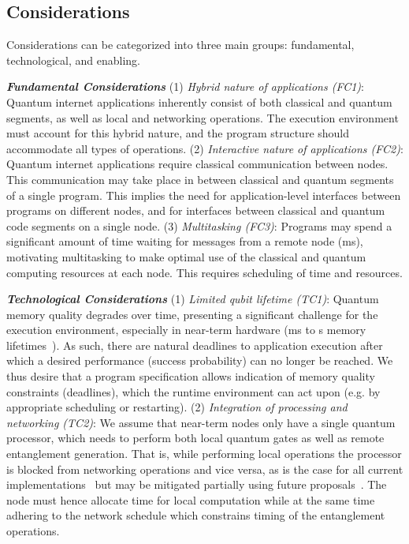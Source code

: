 \subsection{Considerations}
Considerations can be categorized into three main groups: fundamental, technological, and enabling.

\noindent\textit{\textbf{Fundamental Considerations}}
(1) \textit{Hybrid nature of applications (FC1)}: Quantum internet applications inherently consist of both classical and quantum segments, as well as local and networking operations. The execution environment must account for this hybrid nature, and the program structure should accommodate all types of operations.
(2) \textit{Interactive nature of applications (FC2)}: Quantum internet applications require classical communication between nodes. This communication may take place in between classical and quantum segments of a single program. 
This implies the need for application-level interfaces between programs on different nodes, and for interfaces between classical and quantum code segments on a single node.
(3) \textit{Multitasking (FC3)}: Programs may spend a significant amount of time waiting for messages from a remote node (ms), motivating multitasking to make optimal use of the classical and quantum computing resources at each node.  This requires scheduling of time and resources.

\noindent\textit{\textbf{Technological Considerations}}
(1) \textit{Limited qubit lifetime (TC1)}:
Quantum memory quality degrades over time, presenting a significant challenge for the execution environment,
especially in near-term hardware (ms to s memory lifetimes~\cite{ruf2021quantum, pompili2021realization, krutyanskiy2023telecom}).
As such, there are natural deadlines to application execution after which a desired performance (success probability) can no longer be reached.
We thus desire that a program specification allows indication of memory quality constraints (deadlines), which the runtime environment can act upon (e.g. by appropriate scheduling or restarting).
(2) \textit{Integration of processing and networking (TC2)}: We assume that near-term nodes only have a single quantum processor, which needs to perform both local quantum gates as well as remote entanglement generation.
That is, while performing local operations the processor is blocked from networking operations and vice versa, as is the case for all current implementations~\cite{pompili2021realization, krutyanskiy2023entanglement} but may be mitigated partially using future proposals~\cite{vardoyan2022quantum}. 
The node must hence allocate time for local computation while at the same time adhering to the network schedule which constrains timing of the entanglement operations.

